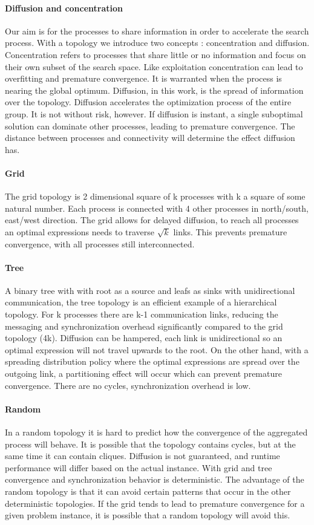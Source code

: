\paragraph{Diffusion and concentration}
Our aim is for the processes to share information in order to accelerate the search process. With a topology we introduce two concepts : concentration and diffusion. Concentration refers to processes that share little or no information and focus on their own subset of the search space. Like exploitation concentration can lead to overfitting and premature convergence. It is warranted when the process is nearing the global optimum. Diffusion, in this work, is the spread of information over the topology. Diffusion accelerates the optimization process of the entire group. It is not without risk, however. If diffusion is instant, a single suboptimal solution can dominate other processes, leading to premature convergence. The distance between processes and connectivity will determine the effect diffusion has.

\paragraph{Grid}
The grid topology is 2 dimensional square of k processes with k a square of some natural number. Each process is connected with 4 other processes in north/south, east/west direction. The grid allows for delayed diffusion, to reach all processes an optimal expressions needs to traverse $\sqrt{k}$ links. This prevents premature convergence, with all processes still interconnected.
\paragraph{Tree}
A binary tree with with root as a source and leafs as sinks with unidirectional communication, the tree topology is an efficient example of a hierarchical topology. For k processes there are k-1 communication links, reducing the messaging and synchronization overhead significantly compared to the grid topology (4k). Diffusion can be hampered, each link is unidirectional so an optimal expression will not travel upwards to the root. On the other hand, with a spreading distribution policy where the optimal expressions are spread over the outgoing link, a partitioning effect will occur which can prevent premature convergence. There are no cycles, synchronization overhead is low.
\paragraph{Random}
In a random topology it is hard to predict how the convergence of the aggregated process will behave. It is possible that the topology contains cycles, but at the same time it can contain cliques. Diffusion is not guaranteed, and runtime performance will differ based on the actual instance. With grid and tree convergence and synchronization behavior is deterministic. The advantage of the random topology is that it can avoid certain patterns that occur in the other deterministic topologies. If the grid tends to lead to premature convergence for a given problem instance, it is possible that a random topology will avoid this.

